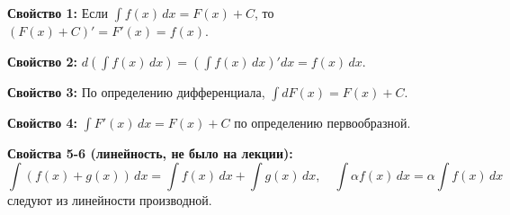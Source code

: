 \begin{Proof}
    \textbf{Свойство 1:} Если \(\int f(x) \, dx = F(x) + C\), то \((F(x) + C)' = F'(x) = f(x)\).
    
    \textbf{Свойство 2:} \(d\left( \int f(x) \, dx \right) = \left( \int f(x) \, dx \right)' dx = f(x) \, dx\).
    
    \textbf{Свойство 3:} По определению дифференциала, \(\int dF(x) = F(x) + C\).
    
    \textbf{Свойство 4:} \(\int F'(x) \, dx = F(x) + C\) по определению первообразной.
    
    \textbf{Свойства 5-6 (линейность, не было на лекции):} 
    \[
    \int (f(x) + g(x)) \, dx = \int f(x) \, dx + \int g(x) \, dx, \quad
    \int \alpha f(x) \, dx = \alpha \int f(x) \, dx
    \]
    следуют из линейности производной.
    
\end{Proof}

